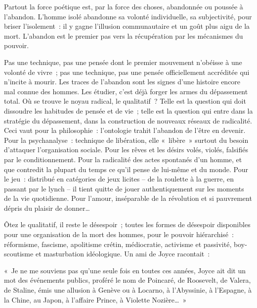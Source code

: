 \documentclass[french,twoside]{book} %
\newenvironment{quoteblock}%
  {\begin{quoting}}
  {\end{quoting}}
\newenvironment{quotebar}{%
    \def\FrameCommand{{\color{rubric!10!}\vrule width 0.5em} \hspace{0.9em}}%
    \def\OuterFrameSep{\itemsep} %
    \MakeFramed {\advance\hsize-\width \FrameRestore}
  }%
  {%
    \endMakeFramed
  }
\renewenvironment{quoteblock}%
  {%
    \savenotes
    \setstretch{0.9}
    \normalfont
    \begin{quotebar}
  }
  {%
    \end{quotebar}
    \spewnotes
  }
\begin{document}
\noindent Partout la force poétique est, par la force des choses, abandonnée ou poussée à l’abandon. L’homme isolé abandonne sa volonté individuelle, sa subjectivité, pour briser l’isolement : il y gagne l’illusion communautaire et un goût plus aigu de la mort. L’abandon est le premier pas vers la récupération par les mécanismes du pouvoir.\par
Pas une technique, pas une pensée dont le premier mouvement n’obéisse à une volonté de vivre ; pas une technique, pas une pensée officiellement accréditée qui n’incite à mourir. Les traces de l’abandon sont les signes d’une histoire encore mal connue des hommes. Les étudier, c’est déjà forger les armes du dépassement total. Où se trouve le noyau radical, le qualitatif ? Telle est la question qui doit dissoudre les habitudes de pensée et de vie ; telle est la question qui entre dans la stratégie du dépassement, dans la construction de nouveaux réseaux de radicalité. Ceci vaut pour la philosophie : l’ontologie trahit l’abandon de l’être en devenir. Pour la psychanalyse : technique de libération, elle « libère » surtout du besoin d’attaquer l’organisation sociale. Pour les rêves et les désirs volés, violés, falsifiés par le conditionnement. Pour la radicalité des actes spontanés d’un homme, et que contredit la plupart du temps ce qu’il pense de lui-même et du monde. Pour le jeu : distribué en catégories de jeux licites – de la roulette à la guerre, en passant par le lynch – il tient quitte de jouer authentiquement sur les moments de la vie quotidienne. Pour l’amour, inséparable de la révolution et si pauvrement dépris du plaisir de donner…\par
Ôtez le qualitatif, il reste le désespoir ; toutes les formes de désespoir disponibles pour une organisation de la mort des hommes, pour le pouvoir hiérarchisé : réformisme, fascisme, apolitisme crétin, médiocratie, activisme et passivité, boy-scoutisme et masturbation idéologique. Un ami de Joyce racontait :\par

\begin{quoteblock}
\noindent « Je ne me souviens pas qu’une seule fois en toutes ces années, Joyce ait dit un mot des événements publics, proféré le nom de Poincaré, de Roosevelt, de Valera, de Staline, émis une allusion à Genève ou à Locarno, à l’Abyssinie, à l’Espagne, à la Chine, au Japon, à l’affaire Prince, à Violette Nozière… »\end{quoteblock}
\end{document}
